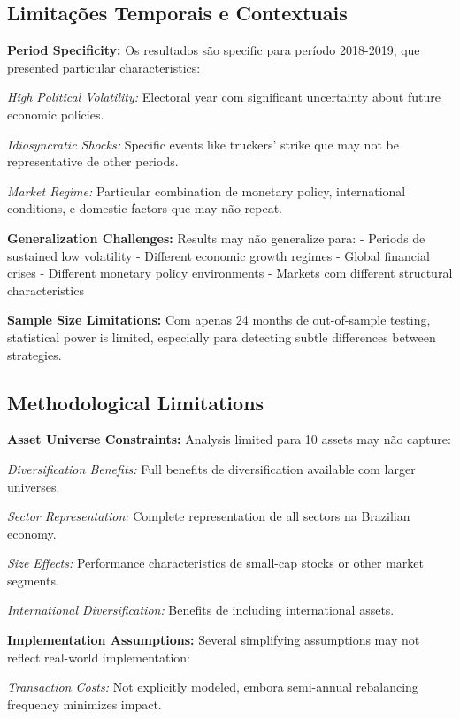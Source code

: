 \subsection{Limitações Temporais e Contextuais}

\textbf{Period Specificity:} Os resultados são specific para período 2018-2019, que presented particular characteristics:

\textit{High Political Volatility:} Electoral year com significant uncertainty about future economic policies.

\textit{Idiosyncratic Shocks:} Specific events like truckers' strike que may not be representative de other periods.

\textit{Market Regime:} Particular combination de monetary policy, international conditions, e domestic factors que may não repeat.

\textbf{Generalization Challenges:} Results may não generalize para:
- Periods de sustained low volatility
- Different economic growth regimes  
- Global financial crises
- Different monetary policy environments
- Markets com different structural characteristics

\textbf{Sample Size Limitations:} Com apenas 24 months de out-of-sample testing, statistical power is limited, especially para detecting subtle differences between strategies.

\subsection{Methodological Limitations}

\textbf{Asset Universe Constraints:} Analysis limited para 10 assets may não capture:

\textit{Diversification Benefits:} Full benefits de diversification available com larger universes.

\textit{Sector Representation:} Complete representation de all sectors na Brazilian economy.

\textit{Size Effects:} Performance characteristics de small-cap stocks or other market segments.

\textit{International Diversification:} Benefits de including international assets.

\textbf{Implementation Assumptions:} Several simplifying assumptions may not reflect real-world implementation:

\textit{Transaction Costs:} Not explicitly modeled, embora semi-annual rebalancing frequency minimizes impact.

